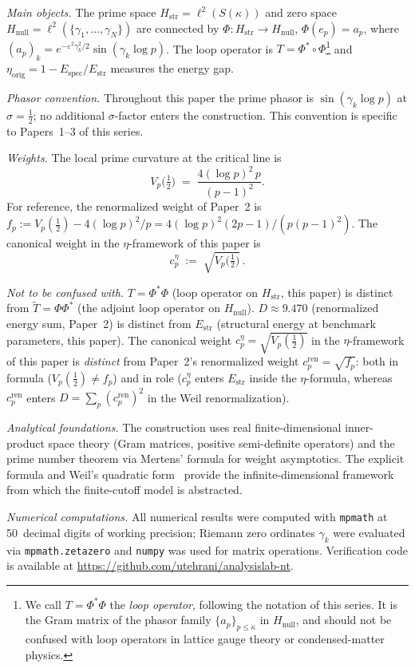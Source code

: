 \documentclass[11pt]{article}
\newcommand{\Hstr}{H_{\mathrm{str}}}
\newcommand{\Hnull}{H_{\mathrm{null}}}
\newcommand{\Estr}{E_{\mathrm{str}}}
\newcommand{\Espec}{E_{\mathrm{spec}}}
\newcommand{\etaorig}{\eta_{\mathrm{orig}}}
\newcommand{\cren}{c_p^{\mathrm{ren}}}
\newcommand{\ceta}{c_p^{\eta}}
\newcommand{\fp}{f_p}
\begin{document}
\medskip
\emph{Main objects.}
The prime space $\Hstr=\ell^2(S(\kappa))$ and zero space
$\Hnull=\ell^2(\{\gamma_1,\ldots,\gamma_N\})$ are connected by
$\Phi\colon\Hstr\to\Hnull$, $\Phi(e_p)=a_p$, where
$(a_p)_k=e^{-\varepsilon^2\gamma_k^2/2}\sin(\gamma_k\log p)$.
The loop operator is $T=\Phi^*\circ\Phi$\footnote{We call $T=\Phi^*\Phi$
the \emph{loop operator}, following the notation of this series. It is the
Gram matrix of the phasor family $\{a_p\}_{p\le\kappa}$ in
$H_{\mathrm{null}}$, and should not be confused with loop operators in
lattice gauge theory or condensed-matter physics.} and
$\etaorig=1-\Espec/\Estr$ measures the energy gap.

\medskip
\emph{Phasor convention.}
Throughout this paper the prime phasor is
$\sin(\gamma_k\log p)$ at $\sigma=\tfrac12$;
no additional $\sigma$-factor enters the construction.
This convention is specific to Papers~1--3 of this series.

\medskip
\emph{Weights.}
The local prime curvature at the critical line is
\[
  V_p\!\bigl(\tfrac12\bigr) \;=\; \frac{4(\log p)^2\,p}{(p-1)^2}.
\]
For reference, the renormalized weight of Paper~2 is
$f_p := V_p(\tfrac12) - 4(\log p)^2/p = 4(\log p)^2(2p-1)/(p(p-1)^2)$.
The canonical weight in the $\eta$-framework of this paper is
\[
  \ceta \;:=\; \sqrt{V_p\!\bigl(\tfrac12\bigr)}\,.
\]

\medskip
\emph{Not to be confused with.}
$T=\Phi^*\Phi$ (loop operator on $\Hstr$, this paper) is distinct from
$\tilde T=\Phi\Phi^*$ (the adjoint loop operator on $\Hnull$).
$D\approx 9.470$ (renormalized energy sum, Paper~2) is distinct from
$\Estr$ (structural energy at benchmark parameters, this paper).
The canonical weight $\ceta = \sqrt{V_p(\tfrac12)}$ in the
$\eta$-framework of this paper is \emph{distinct} from
Paper~2's renormalized weight $\cren = \sqrt{\fp}$:
both in formula ($V_p(\tfrac12) \neq \fp$) and in role
($\ceta$ enters $\Estr$ inside the $\eta$-formula, whereas
$\cren$ enters $D=\sum_p (\cren)^2$ in the Weil renormalization).

\medskip
\emph{Analytical foundations.}
The construction uses real finite-dimensional inner-product space theory
(Gram matrices, positive semi-definite operators) and the prime number theorem
via Mertens' formula for weight asymptotics. The explicit formula and Weil's
quadratic form~\cite{Weil} provide the infinite-dimensional framework from
which the finite-cutoff model is abstracted.

\medskip
\emph{Numerical computations.}
All numerical results were computed with \texttt{mpmath} at 50~decimal digits
of working precision; Riemann zero ordinates $\gamma_k$ were evaluated via
\texttt{mpmath.zetazero} and \texttt{numpy} was used for matrix operations.
Verification code is available at
\url{https://github.com/utehrani/analysislab-nt}.
\end{document}
